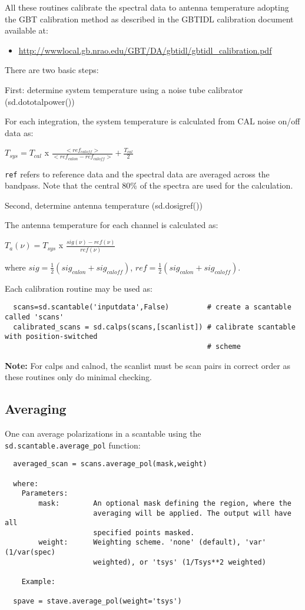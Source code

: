 All these routines calibrate the spectral data to antenna temperature
adopting the GBT calibration method as described in the
GBTIDL calibration document available at: 
\begin{itemize}
   \item \url{http://wwwlocal.gb.nrao.edu/GBT/DA/gbtidl/gbtidl_calibration.pdf}
\end{itemize}
There are two basic steps:

First: determine system temperature using a noise tube calibrator
(sd.dototalpower()) 

For each integration, the system temperature is calculated from
CAL noise on/off data as:

$ T_{sys} = T_{cal}$ x 
$\frac{<ref_{caloff}>}{<ref_{calon} - ref_{caloff}>} + \frac{T_{cal}}{2} $

{\tt ref} refers to reference data and the spectral data are averaged
across the bandpass.  Note that the central 80\% of the spectra are
used for the calculation.

Second, determine antenna temperature (sd.dosigref())

The antenna temperature for each channel is calculated as:

$ T_a(\nu) = T_{sys}$ x 
$\frac{sig(\nu) - ref(\nu)}{ref(\nu)}$

where $sig = \frac{1}{2}(sig_{calon} + sig_{caloff})$, 
      $ref = \frac{1}{2}(sig_{calon} + sig_{caloff}).$


Each calibration routine may be used as:


\small
\begin{verbatim}
  scans=sd.scantable('inputdata',False)         # create a scantable called 'scans'
  calibrated_scans = sd.calps(scans,[scanlist]) # calibrate scantable with position-switched 
                                                # scheme
\end{verbatim}
\normalsize


{\bf Note:} For calps and calnod, the scanlist must be scan pairs in
correct order as these routines only do minimal checking.

\subsection{Averaging}
\label{subsubsection:sd.asap.averaging}

One can average polarizations in a scantable using the
{\tt sd.scantable.average\_pol} function:
\small
\begin{verbatim}
  averaged_scan = scans.average_pol(mask,weight)

  where:
    Parameters:
        mask:        An optional mask defining the region, where the
                     averaging will be applied. The output will have all
                     specified points masked.
        weight:      Weighting scheme. 'none' (default), 'var' (1/var(spec)
                     weighted), or 'tsys' (1/Tsys**2 weighted)

    Example:

  spave = stave.average_pol(weight='tsys')
\end{verbatim}
\normalsize

